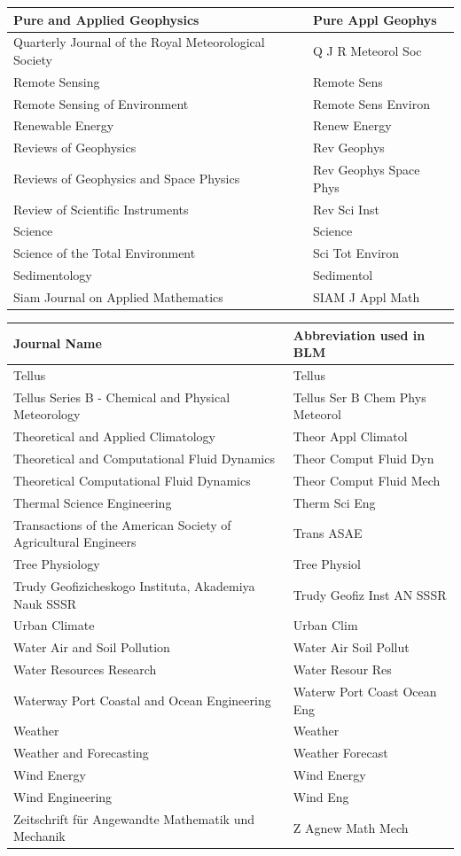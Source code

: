 \begin{longtable}{| p{8 cm} | p{6 cm} |}
Pure and Applied Geophysics & Pure Appl Geophys \\
\hline
Quarterly Journal of the Royal Meteorological Society & Q J R Meteorol Soc \\
\hline
Remote Sensing & Remote Sens \\
Remote Sensing of Environment & Remote Sens Environ \\
Renewable Energy & Renew Energy \\
Reviews of Geophysics & Rev Geophys \\
Reviews of Geophysics and Space Physics & Rev Geophys Space Phys \\
Review of Scientific Instruments & Rev Sci Inst \\
\hline
Science & Science \\
Science of the Total Environment & Sci Tot Environ \\
Sedimentology & Sedimentol \\
Siam Journal on Applied Mathematics & SIAM J Appl Math \\
\hline
\end{longtable}

\pagebreak[4]

\begin{longtable}{| p{8 cm} | p{6 cm} |}
\hline
Journal Name & Abbreviation used in BLM \\
\hline
Tellus & Tellus \\
Tellus Series B - Chemical and Physical Meteorology & Tellus Ser B Chem Phys Meteorol \\
Theoretical and Applied Climatology & Theor Appl Climatol \\
Theoretical and Computational Fluid Dynamics & Theor Comput Fluid Dyn \\
Theoretical Computational Fluid Dynamics & Theor Comput Fluid Mech \\
Thermal Science Engineering & Therm Sci Eng \\
Transactions of the American Society of Agricultural Engineers & Trans ASAE \\
Tree Physiology & Tree Physiol \\
Trudy Geofizicheskogo Instituta, Akademiya Nauk SSSR & Trudy Geofiz Inst AN SSSR \\
\hline
Urban Climate & Urban Clim \\
\hline
Water Air and Soil Pollution & Water Air Soil Pollut \\
Water Resources Research & Water Resour Res \\
Waterway Port Coastal and Ocean Engineering & Waterw Port Coast Ocean Eng \\
Weather & Weather \\
Weather and Forecasting & Weather Forecast \\
Wind Energy & Wind Energy \\
Wind Engineering & Wind Eng \\
\hline
Zeitschrift f\"{u}r Angewandte Mathematik und Mechanik & Z Agnew Math Mech \\
\hline



\hline
\end{longtable}


